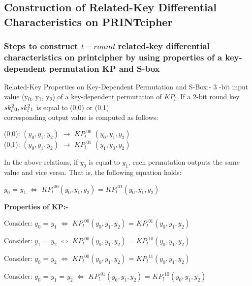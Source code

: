 \documentclass[journal=tosc,preprint]{iacrtrans}
\begin{document}
\subsection{Construction of Related-Key Differential Characteristics on PRINTcipher}
\subsubsection{Steps to construct  \(t-round\) related-key differential characteristics on printcipher by using properties of a key-dependent permutation KP and S-box}
Related-Key Properties on Key-Dependent Permutation and S-Box:-
3 -bit input value (y\textsubscript{0}, y\textsubscript{1}, y\textsubscript{2}) of a key-dependent permutation of \({KP_l}\). If a 2-bit round key \({s{k^2_l\textsubscript{0}}},{sk^2_l\textsubscript{1}}\) is equal to (0,0) or (0,1)  \\

corresponding output value is computed as follows:
\begin{center}
	(0,0): \(({y_0},{y_1},{y_2})\) $\rightarrow$ \({KP_l}^{00}\) 			  \(({y_0},{y_1},{y_2})\) \\
	(0,1): \(({y_0},{y_1},{y_2})\) $\rightarrow$ \({KP_l}^{01}\) \(({y_1},{y_0},{y_2})\) \\
\end{center}

In the above relations, if \({y_0}\) is equal to \({y_1}\), each permutation outputs the same value and vice versa. That is, the following equation holds:
\begin{center}

\({y_0}\) = \({y_1}\) $\Leftrightarrow$ \({KP_l}^{00}\)\(({y_0},{y_1},{y_2})\) = \({KP_l}^{01}\)\(({y_0},{y_1},{y_2})\)
\end{center}


\textbf{Properties of KP:-}

Consider: \({y_0}\) = \({y_1}\) $\Leftrightarrow$ \({KP_l}^{00}\)\(({y_0},{y_1},{y_2})\) = \({KP_l}^{01}\)\(({y_0},{y_1},{y_2})\)

Consider: \({y_1}\) = \({y_2}\) $\Leftrightarrow$ \({KP_l}^{00}\)\(({y_0},{y_1},{y_2})\) = \({KP_l}^{10}\)\(({y_0},{y_1},{y_2})\)

Consider: \({y_0}\) = \({y_2}\) $\Leftrightarrow$ \({KP_l}^{00}\)\(({y_0},{y_1},{y_2})\) = \({KP_l}^{11}\)\(({y_0},{y_1},{y_2})\)

Consider: \({y_0}\) = \({y_1}\) = \({y_2}\) $\Leftrightarrow$ \({KP_l}^{01}\)\(({y_0},{y_1},{y_2})\) = \({KP_l}^{10}\)\(({y_0},{y_1},{y_2})\)
\end{document}
